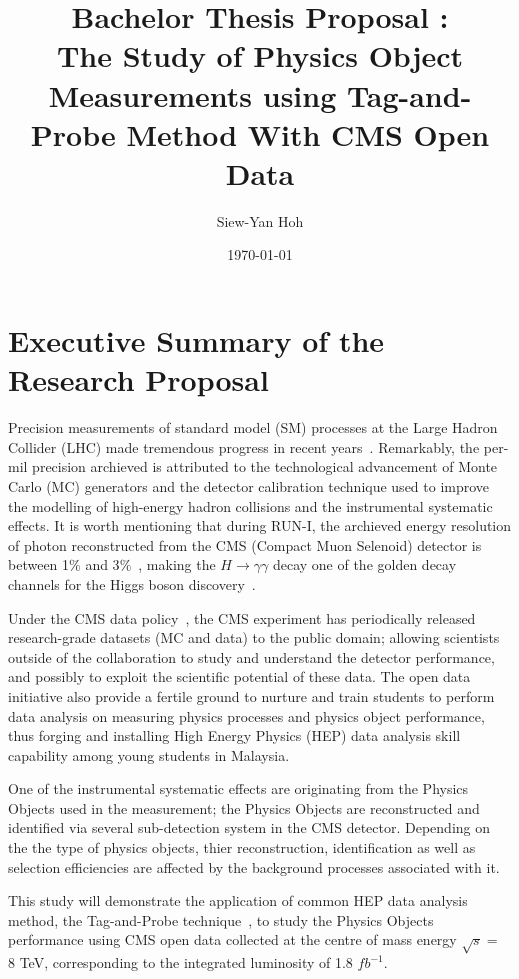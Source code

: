 \documentclass[]{article}
\title{Bachelor Thesis Proposal : \\ The Study of Physics Object Measurements using Tag-and-Probe Method With CMS Open Data}
\author{Siew-Yan Hoh}
\date{\today}
\begin{document}
\maketitle

\section{Executive Summary of the Research Proposal}

Precision measurements of standard model (SM) processes at the Large Hadron Collider (LHC) made tremendous progress in recent years~\cite{ATLAS:2016nqi,CMS:2014pkt,CMS:2013hon,ATLAS:2016rnf,ATLAS:2015iiu}. Remarkably, the per-mil precision archieved is attributed to the technological advancement of Monte Carlo (MC) generators and the detector calibration technique used to improve the modelling of high-energy hadron collisions and the instrumental systematic effects. It is worth mentioning that during RUN-I, the archieved energy resolution of photon reconstructed from the CMS (Compact Muon Selenoid) detector is between 1$\%$ and 3$\%$~\cite{2015pho}, making the $H \rightarrow \gamma \gamma$ decay one of the golden decay channels for the Higgs boson discovery~\cite{CMS:2012qbp}.

Under the CMS data policy~\cite{cmsopendata}, the CMS experiment has periodically released research-grade datasets (MC and data) to the public domain; allowing scientists outside of the collaboration to study and understand the detector performance, and possibly to exploit the scientific potential of these data. The open data initiative also provide a fertile ground to nurture and train students to perform data analysis on measuring physics processes and physics object performance, thus forging and installing High Energy Physics (HEP) data analysis skill capability among young students in Malaysia.

One of the instrumental systematic effects are originating from the Physics Objects used in the measurement; the Physics Objects are reconstructed and identified via several sub-detection system in the CMS detector. Depending on the the type of physics objects, thier reconstruction, identification as well as selection efficiencies are affected by the background processes associated with it.

This study will demonstrate the application of common HEP data analysis method, the Tag-and-Probe technique~\cite{Behnke:1517556}, to study the Physics Objects performance using CMS open data collected at the centre of mass energy $\sqrt{s} =$ 8 TeV, corresponding to the integrated luminosity of 1.8 $fb^{-1}$.
\end{document}
